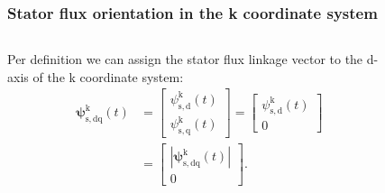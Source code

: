 \begin{frame}
	\frametitle{Stator flux orientation in the k coordinate system}
    \begin{columns}
		\begin{column}{0.5\textwidth}
	       Per definition we can assign the stator flux linkage vector to the d-axis of the k coordinate system:
           \begin{equation}
            \renewcommand{\arraystretch}{1.4}
            \begin{split}
                \bm{\psi}^\mathrm{k}_\mathrm{s,dq}(t) &= \begin{bmatrix} \psi_{\mathrm{s,d}}^\mathrm{k}(t) \\ \psi_{\mathrm{s,q}}^\mathrm{k}(t) \end{bmatrix} = \begin{bmatrix} \psi_{\mathrm{s,d}}^\mathrm{k}(t) \\ 0 \end{bmatrix}\\
                &= \begin{bmatrix}|\bm{\psi}^\mathrm{k}_\mathrm{s,dq}(t)| \\ 0 \end{bmatrix}.
            \end{split}
           \end{equation}
        \end{column}
        \begin{column}{0.5\textwidth}
            \begin{figure}
                \centering

\end{figure}
\end{column}
\end{columns}
\end{frame}
